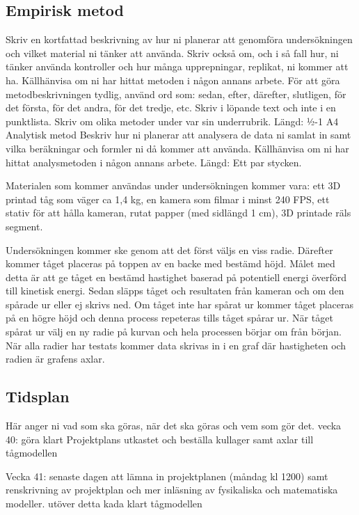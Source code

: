\subsection{Empirisk metod}
Skriv en kortfattad beskrivning av hur ni planerar att genomföra undersökningen och vilket material ni tänker att använda. Skriv också om, och i så fall hur, ni tänker använda kontroller och hur många upprepningar, replikat, ni kommer att ha. Källhänvisa om ni har hittat metoden i någon annans arbete. För att göra metodbeskrivningen tydlig, använd ord som: sedan, efter, därefter, slutligen, för det första, för det andra, för det tredje, etc. Skriv i löpande text och inte i en punktlista. Skriv om olika metoder under var sin underrubrik.
Längd: ½-1 A4
Analytisk metod
Beskriv hur ni planerar att analysera de data ni samlat in samt vilka beräkningar och formler ni då kommer att använda. Källhänvisa om ni har hittat analysmetoden i någon annans arbete.
Längd: Ett par stycken.

Materialen som kommer användas under undersökningen kommer vara: ett 3D printad tåg som väger ca 1,4 kg, en kamera som filmar i minst 240 FPS, ett stativ för att hålla kameran, rutat papper (med sidlängd 1 cm), 3D printade räls segment. 

Undersökningen kommer ske genom att det först väljs en viss radie. Därefter kommer tåget placeras på toppen av en backe med bestämd höjd. Målet med detta är att ge tåget en bestämd hastighet baserad på potentiell energi överförd till kinetisk energi. Sedan släpps tåget och resultaten från kameran och om den spårade ur eller ej skrivs ned. Om tåget inte har spårat ur kommer tåget placeras på en högre höjd och denna process repeteras tills tåget spårar ur. När tåget spårat ur välj en ny radie på kurvan och hela processen börjar om från början. När alla radier har testats kommer data skrivas in i en graf där hastigheten och radien är grafens axlar.



\subsection{Tidsplan}
Här anger ni vad som ska göras, när det ska göras och vem som gör det.
vecka 40:
göra klart Projektplans utkastet och beställa kullager samt axlar till tågmodellen

Vecka 41: senaste dagen att lämna in projektplanen (måndag kl 1200) samt renskrivning av projektplan och mer inläsning av fysikaliska och matematiska modeller. utöver detta kada klart tågmodellen

